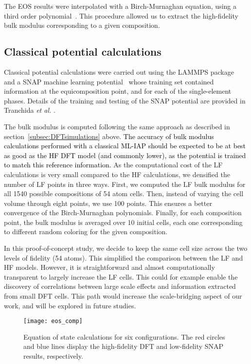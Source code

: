 \documentclass[%
 reprint,
aip,jcp
]{revtex4-1}
\newcommand{\review}[1]{\textcolor{black}{#1}}
\begin{document}
The EOS results were interpolated with a Birch-Murnaghan equation, 
using a third order
polynomial~\cite{birch1978finite,murnaghan1937finite}. 
This procedure allowed us to extract the high-fidelity bulk modulus
corresponding to a given composition.

\subsection{Classical potential calculations}
\label{subsec:MDsimulations}

Classical potential calculations were carried out using the LAMMPS 
package~\cite{plimpton1995fast} and a SNAP machine learning
potential~\cite{thompson2015spectral} whose training set contained
information at the equicomposition point, and for each of the
single-element phases.
Details of the training and testing of the SNAP potential are provided in
Tranchida \emph{et al.} \cite{tranchida2020AlNbTi_SNAP}. 

The bulk modulus is computed following the same approach as
described in section~\ref{subsec:DFTsimulations} above.
\review{
The accuracy of bulk modulus calculations performed with a classical ML-IAP
should be expected to be at best as good as the HF DFT model (and
commonly lower), as the potential is trained to match this reference 
information.
}
As the computational cost of the LF 
calculations is very small compared to the HF calculations, we densified the
number of LF points in three ways.
First, we computed the LF bulk modulus for all 1540 possible
compositions of 54 atom cells.
Then, instead of varying the cell volume through eight points,
we use 100 points. 
This ensures a better convergence of the Birch-Murnaghan 
polynomials.
Finally, for each composition point, the bulk modulus is averaged
over 10 initial cells, each one corresponding to different random 
coloring for the given composition.

In this proof-of-concept study, we decide to keep the same cell size
across the two levels of fidelity (54 atoms).
This simplified the comparison between the LF and HF models. 
However, it is straightforward and almost computationally
transparent to largely increase the LF cells. 
This could for example enable the discovery of correlations
between large scale effects and information extracted from small
DFT cells.
This path would increase the scale-bridging aspect of our work, and will be
explored in future studies.

\begin{figure}[!htbp]
\centering
\texttt{[image: eos\_comp]}
\caption{Equation of state calculations for six configurations.
  The red circles and blue lines display the high-fidelity DFT
  and low-fidelity SNAP results, respectively.}
\label{fig:cropped_configs}
\end{figure}
\end{document}
